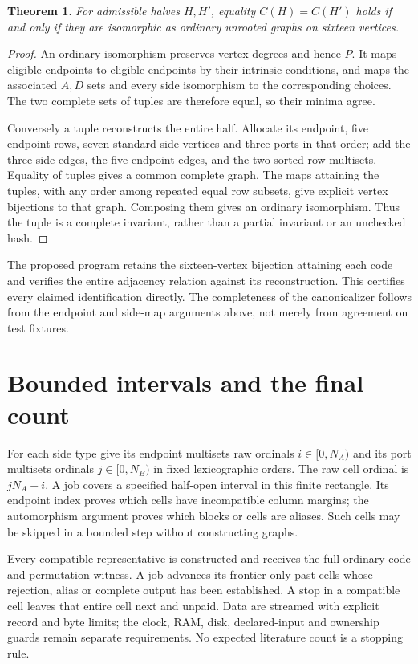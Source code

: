 \documentclass[11pt]{article}
\newtheorem{theorem}{Theorem}
\begin{document}
\begin{theorem}\label{ordinary}
For admissible halves $H,H'$, equality $C(H)=C(H')$ holds if and only
if they are isomorphic as ordinary unrooted graphs on sixteen vertices.
\end{theorem}
\begin{proof}
An ordinary isomorphism preserves vertex degrees and hence $P$. It maps
eligible endpoints to eligible endpoints by their intrinsic conditions,
and maps the associated $A,D$ sets and every side isomorphism to the
corresponding choices. The two complete sets of tuples are therefore
equal, so their minima agree.

Conversely a tuple reconstructs the entire half. Allocate its endpoint,
five endpoint rows, seven standard side vertices and three ports in
that order; add the three side edges, the five endpoint edges, and the
two sorted row multisets. Equality of tuples gives a common complete
graph. The maps attaining the tuples, with any order among repeated
equal row subsets, give explicit vertex bijections to that graph.
Composing them gives an ordinary isomorphism. Thus the tuple is a
complete invariant, rather than a partial invariant or an unchecked hash.
\end{proof}

The proposed program retains the sixteen-vertex bijection attaining
each code and verifies the entire adjacency relation against its
reconstruction. This certifies every claimed identification directly.
The completeness of the canonicalizer follows from the endpoint and
side-map arguments above, not merely from agreement on test fixtures.

\section*{Bounded intervals and the final count}

For each side type give its endpoint multisets raw ordinals
$i\in[0,N_A)$ and its port multisets ordinals $j\in[0,N_B)$ in fixed
lexicographic orders. The raw cell ordinal is $jN_A+i$. A job covers a
specified half-open interval in this finite rectangle. Its endpoint
index proves which cells have incompatible column margins; the
automorphism argument proves which blocks or cells are aliases. Such
cells may be skipped in a bounded step without constructing graphs.

Every compatible representative is constructed and receives the full
ordinary code and permutation witness. A job advances its frontier
only past cells whose rejection, alias or complete output has been
established. A stop in a compatible cell leaves that entire cell next
and unpaid. Data are streamed with explicit record and byte limits;
the clock, RAM, disk, declared-input and ownership guards remain
separate requirements. No expected literature count is a stopping rule.
\end{document}
